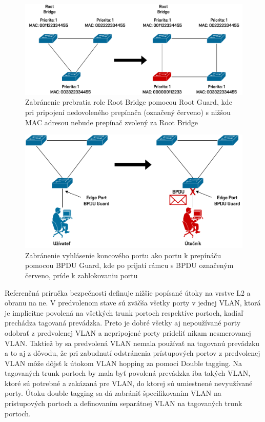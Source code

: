 \begin{figure}[H]
	\begin{center}
		\includegraphics[scale=0.75]{obrazky/root-guard.pdf}
	\end{center}
	\caption[Zabránenie prebratia role Root Bridge pomocou Root Guard]{Zabránenie prebratia role Root Bridge pomocou Root Guard, kde pri pripojení nedovoleného prepínača (označený červeno) s nižšou MAC adresou nebude prepínač zvolený za Root Bridge}
	\label{fig:root-guard}
\end{figure} 

\begin{figure}[H]
	\begin{center}
		\includegraphics[scale=0.75]{obrazky/bpdu-guard.pdf}
	\end{center}
	\caption[Zabránenie vyhlásenie koncového portu ako portu k prepínáču pomocou BPDU Guard]{Zabránenie vyhlásenie koncového portu ako portu k prepínáču pomocou BPDU Guard, kde po prijatí rámcu s BPDU označeným červeno, príde k zablokovaniu portu}
	\label{fig:bpdu-guard}
\end{figure} 

Referenčná príručka bezpečnosti \cite{uYLsMtQInofenpV3} definuje nižšie popísané útoky na vrstve L2 a obranu na ne. V predvolenom stave sú zväčša všetky porty v jednej VLAN, ktorá je implicitne povolená na všetkých trunk portoch respektíve portoch, kadiaľ prechádza tagovaná prevádzka. Preto je dobré všetky aj nepoužívané porty odobrať z predvolenej VLAN a nepripojené porty prideliť nikam nesmerovanej VLAN. Taktiež by sa predvolená VLAN nemala používať na tagovanú prevádzku a to aj z dôvodu, že pri zabudnutí odstránenia prístupových portov z predvolenej VLAN môže dôjsť k útokom VLAN hopping za pomoci Double tagging. Na tagovaných trunk portoch by mala byť povolená prevádzka iba takých VLAN, ktoré sú potrebné a zakázaná pre VLAN, do ktorej sú umiestnené nevyužívané porty. Útoku double tagging sa dá zabrániť špecifikovaním VLAN na prístupových portoch a definovaním separátnej VLAN na tagovaných trunk portoch.

